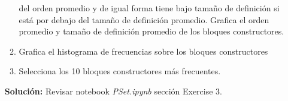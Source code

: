 \documentclass[10pt,letterpaper]{article}
\begin{document}
\begin{enumerate}
\begin{enumerate}
                  del orden promedio y de igual forma tiene bajo tamaño de definición
                  si está por debajo del tamaño de definición promedio. Grafica el
                  orden promedio y tamaño de definición promedio de los bloques
                  constructores.
            \item Grafica el histograma de frecuencias sobre los bloques constructores
            \item Selecciona los 10 bloques constructores más frecuentes.
        \end{enumerate}
        \textbf{Solución:} Revisar notebook \textit{PSet.ipynb} sección Exercise 3.
\end{enumerate}
\end{document}
